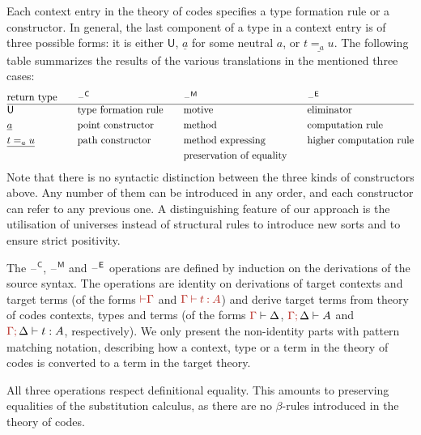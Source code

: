 \documentclass[a4paper,UKenglish]{lipics-v2018}
\newcommand{\U}{\mathsf{U}}
\newcommand{\blank}{\mathord{\hspace{1pt}\text{--}\hspace{1pt}}} %
\newcommand{\C}{\mathsf{C}}
\newcommand{\M}{\mathsf{M}}
\newcommand{\1}{\mathsf{1}} \renewcommand{\Pr}{\mathsf{Pr}}
\renewcommand{\in}{\mathbin{\hat:}}
\renewcommand{\hat}[1]{{\color{BrickRed}{#1}}}
\newcommand{\vdashh}{\mathbin{\hat\vdash}}
\newcommand{\semicol}{\hat;\,}
\begin{document}
Each context entry in the theory of codes specifies a type formation
rule or a constructor. In general, the last component of a type in a
context entry is of three possible forms: it is either $\U$,
$\underline{a}$ for some neutral $a$, or $\underline{t=_a u}$. The
following table summarizes the results of the various translations in
the mentioned three cases:
\begin{alignat*}{5}
  & \text{return type}\hspace{1em} && \blank^\C && \blank^\M && \blank^\E \\\hline
  & \U && \text{type formation rule}\hspace{1em} && \text{motive} && \text{eliminator} \\
  & \underline{a} && \text{point constructor}\hspace{1em} && \text{method} && \text{computation rule} \\
  & \underline{t=_a u} && \text{path constructor} && \text{method expressing} && \text{higher computation rule} \\
  & && && \text{preservation of equality}\hspace{1em}
\end{alignat*}
Note that there is no syntactic distinction between the three kinds of
constructors above. Any number of them can be introduced in any order,
and each constructor can refer to any previous one. A distinguishing
feature of our approach is the utilisation of universes instead of
structural rules to introduce new sorts and to ensure strict
positivity.

The $\blank^\C$, $\blank^\M$ and $\blank^\E$ operations are defined by
induction on the derivations of the source syntax. The operations are
identity on derivations of target contexts and target terms (of the
forms $\vdashh\hat{\Gamma}$ and $\hat{\Gamma}\vdashh \hat{t}\in
\hat{A}$) and derive target terms from theory of codes contexts, types
and terms (of the forms $\hat{\Gamma}\vdash\Delta$,
$\hat{\Gamma}\semicol\Delta\vdash A$ and
$\hat{\Gamma}\semicol\Delta\vdash t:A$, respectively). We only present
the non-identity parts with pattern matching notation, describing how
a context, type or a term in the theory of codes is converted to a
term in the target theory.

All three operations respect definitional equality. This amounts to
preserving equalities of the substitution calculus, as there are no
$\beta$-rules introduced in the theory of codes.

\end{document}
